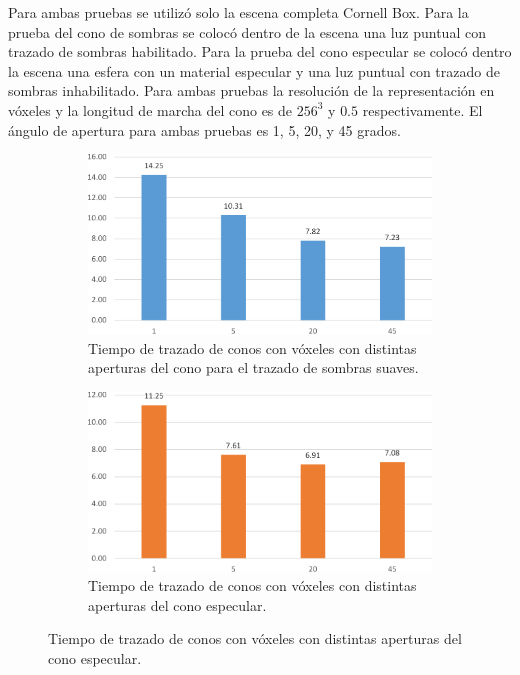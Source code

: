 Para ambas pruebas se utilizó solo la escena completa Cornell Box. Para la prueba del cono de sombras se colocó dentro de la escena una luz puntual con trazado de sombras habilitado. Para la prueba del cono especular se colocó dentro la escena una esfera con un material especular y una luz puntual con trazado de sombras inhabilitado. Para ambas pruebas la resolución de la representación en vóxeles y la longitud de marcha del cono es de $256^3$ y $0.5$ respectivamente. El ángulo de apertura para ambas pruebas es 1, 5, 20, y 45 grados.

\begin{figure}[H]
	\centering
	\begin{subfigure}{.7\textwidth}
		\centering
		\includegraphics[width=\linewidth]{media/shadowcone_aperture_cropped.pdf}
		\caption{Tiempo de trazado de conos con vóxeles con distintas aperturas del cono para el trazado de sombras suaves.}
		\label{fig:shadowcone_aperture}
	\end{subfigure}
	\par\bigskip
	\begin{subfigure}{.7\textwidth}
		\centering
		\includegraphics[width=\linewidth]{media/specularcone_aperture_cropped.pdf}
		\caption{Tiempo de trazado de conos con vóxeles con distintas aperturas del cono especular.}
		\label{fig:specularcone_aperture}
	\end{subfigure}
\end{figure}
